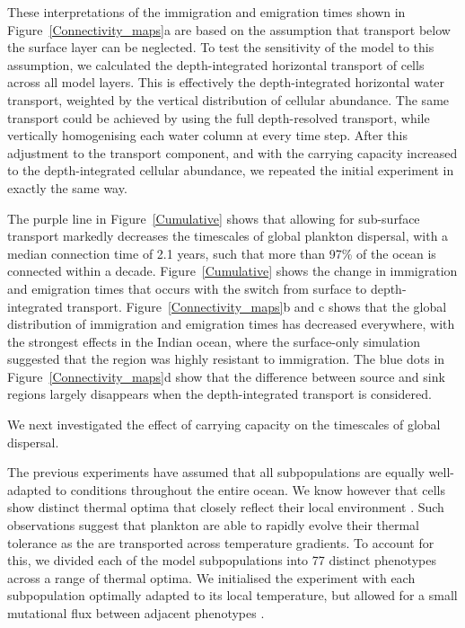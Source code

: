 \documentclass[12pt]{article}
\begin{document}
These interpretations of the immigration and emigration times shown in Figure~\ref{Connectivity_maps}a are based on the assumption that transport below the surface layer can be neglected. To test the sensitivity of the model to this assumption, we calculated the depth-integrated horizontal transport of cells across all model layers. This is effectively the depth-integrated horizontal water transport, weighted by the vertical distribution of cellular abundance. The same transport could be achieved by using the full depth-resolved transport, while vertically homogenising each water column at every time step. After this adjustment to the transport component, and with the carrying capacity increased to the depth-integrated cellular abundance, we repeated the initial experiment in exactly the same way. 


The purple line in Figure~\ref{Cumulative} shows that allowing for sub-surface transport markedly decreases the timescales of global plankton dispersal, with a median connection time of 2.1 years, such that more than 97\% of the ocean is connected within a decade. Figure~\ref{Cumulative} shows the change in immigration and emigration times that occurs with the switch from surface to depth-integrated transport. Figure~\ref{Connectivity_maps}b and c shows that the global distribution of immigration and emigration times has decreased everywhere, with the strongest effects in the Indian ocean, where the surface-only simulation suggested that the region was highly resistant to immigration. The blue dots in Figure~\ref{Connectivity_maps}d show that the difference between source and sink regions largely disappears when the depth-integrated transport is considered. 

We next investigated the effect of carrying capacity on the timescales of global dispersal. 



The previous experiments have assumed that all subpopulations are equally well-adapted to conditions throughout the entire ocean. We know however that cells show distinct thermal optima that closely reflect their local environment \citep{Thomas:2012}. Such observations suggest that plankton are able to rapidly evolve their thermal tolerance as the are transported across temperature gradients. To account for this, we divided each of the model subpopulations into 77 distinct phenotypes across a range of thermal optima. We initialised the experiment with each subpopulation optimally adapted to its local temperature, but allowed for a small mutational flux between adjacent phenotypes \citep{Beckman:2019}.
\end{document}
